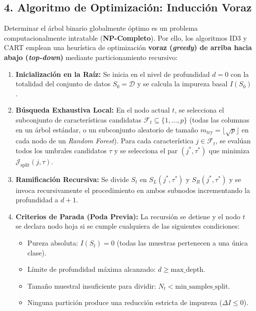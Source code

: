 \documentclass[11pt, a4paper]{article}
\begin{document}
\subsection*{4. Algoritmo de Optimización: Inducción Voraz}
Determinar el árbol binario globalmente óptimo es un problema computacionalmente intratable (\textbf{NP-Completo}). Por ello, los algoritmos ID3 y CART emplean una heurística de optimización \textbf{voraz (\textit{greedy}) de arriba hacia abajo (\textit{top-down})} mediante particionamiento recursivo:
\begin{enumerate}
    \item \textbf{Inicialización en la Raíz:} Se inicia en el nivel de profundidad $d = 0$ con la totalidad del conjunto de datos $S_0 = \mathcal{D}$ y se calcula la impureza basal $I(S_0)$.
    \item \textbf{Búsqueda Exhaustiva Local:} En el nodo actual $t$, se selecciona el subconjunto de características candidatas $\mathcal{F}_t \subseteq \{1, \dots, p\}$ (todas las columnas en un árbol estándar, o un subconjunto aleatorio de tamaño $m_{\text{try}} = \lfloor\sqrt{p}\rfloor$ en cada nodo de un \textit{Random Forest}). Para cada característica $j \in \mathcal{F}_t$, se evalúan todos los umbrales candidatos $\tau$ y se selecciona el par $(j^*, \tau^*)$ que minimiza $\mathcal{J}_{\text{split}}(j, \tau)$.
    \item \textbf{Ramificación Recursiva:} Se divide $S_t$ en $S_L(j^*, \tau^*)$ y $S_R(j^*, \tau^*)$ y se invoca recursivamente el procedimiento en ambos subnodos incrementando la profundidad a $d + 1$.
    \item \textbf{Criterios de Parada (Poda Previa):} La recursión se detiene y el nodo $t$ se declara nodo hoja si se cumple cualquiera de las siguientes condiciones:
    \begin{itemize}
        \item Pureza absoluta: $I(S_t) = 0$ (todas las muestras pertenecen a una única clase).
        \item Límite de profundidad máxima alcanzado: $d \ge \text{max\_depth}$.
        \item Tamaño muestral insuficiente para dividir: $N_t < \text{min\_samples\_split}$.
        \item Ninguna partición produce una reducción estricta de impureza ($\Delta I \le 0$).
    \end{itemize}
\end{enumerate}
\end{document}
